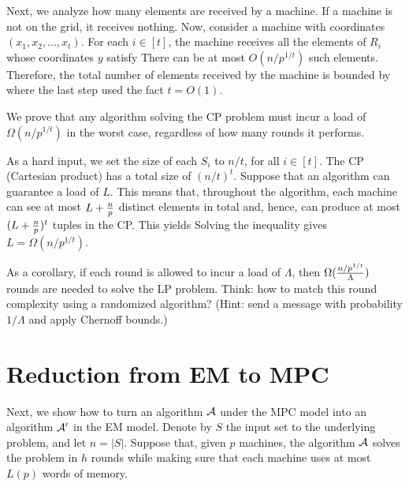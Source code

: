 Next, we analyze how many elements are received by a machine. If a machine is not on the grid, it receives nothing. Now, consider a machine with coordinates $(x_1, x_2, ..., x_t)$. For each $i \in [t]$, the machine receives all the elements of $R_i$ whose coordinates $y$ satisfy
There can be at most $O(n / p^{1/t})$ such elements. Therefore, the total number of elements received by the machine is bounded by
where the last step used the fact $t = O(1)$.

 We prove that any algorithm solving the CP problem must incur a load of $\Omega(n / p^{1/t})$ in the worst case, regardless of how many rounds it performs.

\vgap

As a hard input, we set the size of each $S_i$ to $n/t$, for all $i \in [t]$. The CP (Cartesian product) has a total size of $(n/t)^t$. Suppose that an algorithm can guarantee a load of $L$.  This means that, throughout the algorithm, each machine can see at most $L + \frac{n}{p}$ distinct elements in total and, hence, can produce at most $(L + \frac{n}{p})^t$ tuples in the CP. This yields
Solving the inequality gives $L = \Omega(n / p^{1/t})$.

\vgap

As a corollary, if each round is allowed to incur a load of $\Lambda$, then $\Omega(\frac{n / p^{1/t}}{\Lambda})$ rounds are needed to solve the LP problem. Think: how to match this round complexity using a randomized algorithm? (Hint: send a message with probability $1/\Lambda$ and apply Chernoff bounds.)

\section{Reduction from EM to MPC} \label{sec:em2mpc}

Next, we show how to turn an algorithm $\mathcal{A}$ under the MPC model into an algorithm $\mathcal{A}'$ in the EM model. Denote by $S$ the input set to the underlying problem, and let $n = |S|$. Suppose that, given $p$ machines, the algorithm $\mathcal{A}$ solves the problem in $h$ rounds while making sure that each machine uses at most $L(p)$ words of memory.

